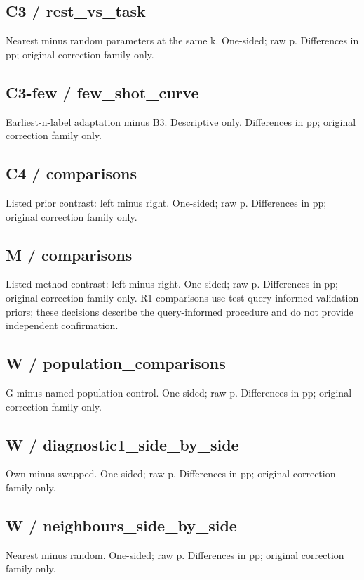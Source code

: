 \subsection*{C3 / rest\_\allowbreak{}vs\_\allowbreak{}task}
Nearest minus random parameters at the same k. One-sided; raw p. Differences in pp; original correction family only. 

\subsection*{C3-few / few\_\allowbreak{}shot\_\allowbreak{}curve}
Earliest-n-label adaptation minus B3. Descriptive only. Differences in pp; original correction family only. 

\subsection*{C4 / comparisons}
Listed prior contrast: left minus right. One-sided; raw p. Differences in pp; original correction family only. 

\subsection*{M / comparisons}
Listed method contrast: left minus right. One-sided; raw p. Differences in pp; original correction family only. R1 comparisons use test-query-informed validation priors; these decisions describe the query-informed procedure and do not provide independent confirmation. 

\subsection*{W / population\_\allowbreak{}comparisons}
G minus named population control. One-sided; raw p. Differences in pp; original correction family only. 

\subsection*{W / diagnostic1\_\allowbreak{}side\_\allowbreak{}by\_\allowbreak{}side}
Own minus swapped. One-sided; raw p. Differences in pp; original correction family only. 

\subsection*{W / neighbours\_\allowbreak{}side\_\allowbreak{}by\_\allowbreak{}side}
Nearest minus random. One-sided; raw p. Differences in pp; original correction family only. 

